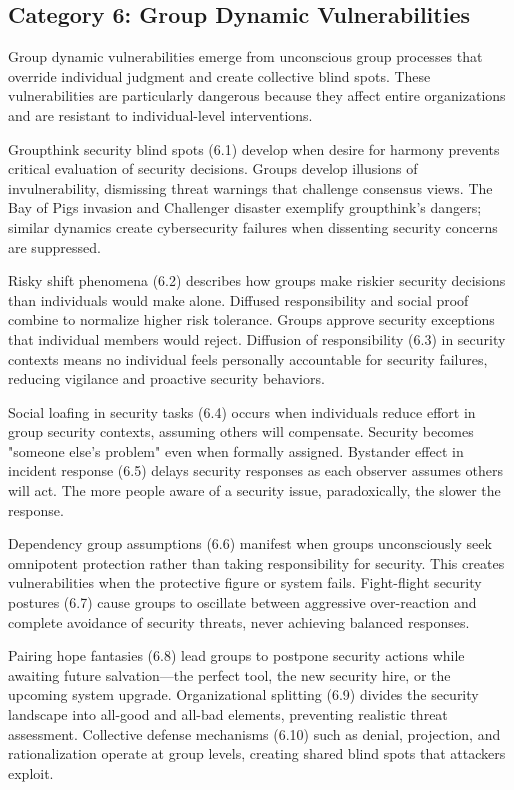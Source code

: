 \documentclass[manuscript,screen,review]{acmart}
\begin{document}
\subsection{Category 6: Group Dynamic Vulnerabilities}

Group dynamic vulnerabilities emerge from unconscious group processes that override individual judgment and create collective blind spots. These vulnerabilities are particularly dangerous because they affect entire organizations and are resistant to individual-level interventions.

Groupthink security blind spots (6.1) develop when desire for harmony prevents critical evaluation of security decisions. Groups develop illusions of invulnerability, dismissing threat warnings that challenge consensus views. The Bay of Pigs invasion and Challenger disaster exemplify groupthink's dangers; similar dynamics create cybersecurity failures when dissenting security concerns are suppressed.

Risky shift phenomena (6.2) describes how groups make riskier security decisions than individuals would make alone. Diffused responsibility and social proof combine to normalize higher risk tolerance. Groups approve security exceptions that individual members would reject. Diffusion of responsibility (6.3) in security contexts means no individual feels personally accountable for security failures, reducing vigilance and proactive security behaviors.

Social loafing in security tasks (6.4) occurs when individuals reduce effort in group security contexts, assuming others will compensate. Security becomes "someone else's problem" even when formally assigned. Bystander effect in incident response (6.5) delays security responses as each observer assumes others will act. The more people aware of a security issue, paradoxically, the slower the response.

Dependency group assumptions (6.6) manifest when groups unconsciously seek omnipotent protection rather than taking responsibility for security. This creates vulnerabilities when the protective figure or system fails. Fight-flight security postures (6.7) cause groups to oscillate between aggressive over-reaction and complete avoidance of security threats, never achieving balanced responses.

Pairing hope fantasies (6.8) lead groups to postpone security actions while awaiting future salvation—the perfect tool, the new security hire, or the upcoming system upgrade. Organizational splitting (6.9) divides the security landscape into all-good and all-bad elements, preventing realistic threat assessment. Collective defense mechanisms (6.10) such as denial, projection, and rationalization operate at group levels, creating shared blind spots that attackers exploit.
\end{document}
